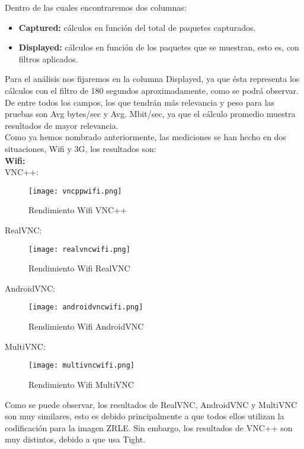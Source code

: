 Dentro de las cuales encontraremos dos columnas:
\begin{itemize}
\item \textbf{Captured:} cálculos en función del total de paquetes capturados.
\item \textbf{Displayed:} cálculos en función de los paquetes que se muestran, esto es, con filtros aplicados.
\end{itemize}

Para el análisis nos fijaremos en la columna Displayed, ya que ésta representa los cálculos con el filtro de 180 segundos aproximadamente, como se podrá observar. De entre todos los campos, los que tendrán más relevancia y peso para las pruebas son Avg bytes/sec y Avg. Mbit/sec, ya que el cálculo promedio muestra resultados de mayor relevancia.\\
\newpage
Como ya hemos nombrado anteriormente, las mediciones se han hecho en dos situaciones, Wifi y 3G, los resultados son:\\

\textbf{Wifi:}\\

VNC++:
\begin{figure}[h]
\begin{flushleft}
\texttt{[image: vncppwifi.png]}
\end{flushleft}
\caption{Rendimiento Wifi VNC++}
\end{figure}

RealVNC:
\begin{figure}[h]
\begin{flushleft}
\texttt{[image: realvncwifi.png]}
\end{flushleft}
\caption{Rendimiento Wifi RealVNC}
\end{figure}

AndroidVNC:
\begin{figure}[h]
\begin{flushleft}
\texttt{[image: androidvncwifi.png]}
\end{flushleft}
\caption{Rendimiento Wifi AndroidVNC}
\end{figure}
\newpage
MultiVNC:
\begin{figure}[h]
\begin{flushleft}
\texttt{[image: multivncwifi.png]}
\end{flushleft}
\caption{Rendimiento Wifi MultiVNC}
\end{figure}

Como se puede observar, los resultados de RealVNC, AndroidVNC y MultiVNC son muy similares, esto es debido principalmente a que todos ellos utilizan la codificación para la imagen ZRLE. Sin embargo, los resultados de VNC++ son muy distintos, debido a que usa Tight.\\

